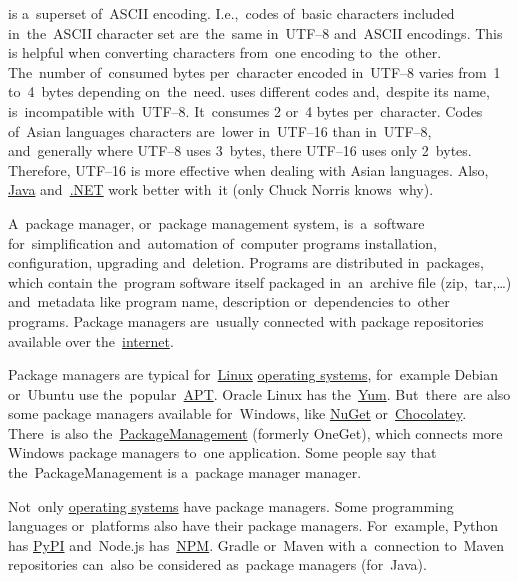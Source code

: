 \label{utf}
\begin{itemize}
     is a~superset of~ASCII encoding.
            I.e.,~codes of~basic characters included in~the~ASCII character set are~the~same in~UTF--8 and~ASCII encodings.
            This is helpful when converting characters from~one encoding to~the~other.
            The~number of~consumed bytes per~character encoded in~\mbox{UTF--8} varies from~1 to~4~bytes depending on~the~need.
     uses different codes and,~despite its name, is~incompatible with~\mbox{UTF--8}.
            It~consumes 2 or~4 bytes per~character.
            Codes of~Asian languages characters are~lower in~\mbox{UTF--16} than in~\mbox{UTF--8}, and~generally where \mbox{UTF--8} uses 3~bytes, there \mbox{UTF--16} uses only 2~bytes.
            Therefore, \mbox{UTF--16} is more effective when dealing with Asian languages.
            Also, \hyperref[java]{Java} and~\hyperref[dotnet]{.NET} work better with~it (only Chuck Norris knows~why).
\end{itemize}

\label{packagemanager}
A~package manager, or~package management system, is~a~software for~simplification and~automation of~computer programs installation, configuration, upgrading and~deletion.
Programs are distributed in~packages, which contain the~program software itself packaged in~an~archive file (zip,~tar,\dots) and~metadata like program name, description or~dependencies to~other programs.
Package managers are~usually connected with package repositories available over the~\hyperref[internetweb]{internet}.

Package managers are typical for~\hyperref[linux]{Linux} \hyperref[os]{operating systems}, for~example Debian or~Ubuntu use the~popular~\hyperref[linuxapt]{APT}.
Oracle Linux has the~\href{http://yum.baseurl.org/}{Yum}.
But~there~are also some package managers available for~Windows, like \href{https://www.nuget.org/}{NuGet} or~\href{https://chocolatey.org/}{Chocolatey}.
There~is also the~\hyperref[windowspackagemanagement]{PackageManagement} (formerly OneGet), which connects more Windows package managers to~one application.
Some people say that the~PackageManagement is a~package manager manager.

Not~only \hyperref[os]{operating systems} have package managers.
Some programming languages or~platforms also have their package managers.
For~example, Python has \href{https://pypi.org/}{PyPI} and~Node.js has~\hyperref[npm]{NPM}.
Gradle or~Maven with a~connection to~Maven repositories can~also be considered as~package managers (for~Java).

